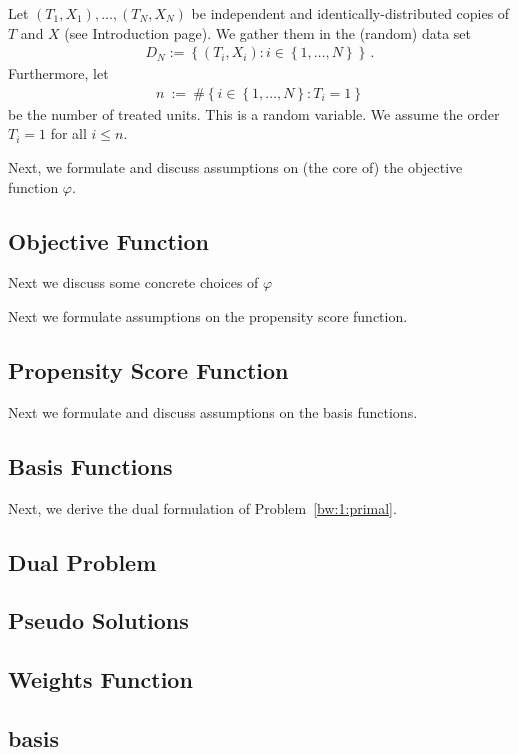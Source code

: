 Let $(T_1,X_1),\ldots,(T_N,X_N)$ be independent and identically-distributed copies of $T$ and $X$ (see Introduction page). 
We gather them in the (random) data set 
\begin{gather*}
D_N:=\left\{ (T_i,X_i)\colon i\in \left\{ 1,\ldots,N \right\} \right\}
\,.
\end{gather*}
Furthermore, let
\begin{gather*}
  n
  \ 
  :=
  \ 
  \# 
  \left\{ 
    i\in \left\{ 1,\ldots,N \right\}
    \colon
    T_i=1
  \right\}
\end{gather*}
be the number of treated units. This is a random variable. We assume the order $T_i=1$ for all $i\le n$.



Next, we formulate and discuss assumptions on (the core of) the objective function $\varphi$.
\subsection{Objective Function}


Next we discuss some concrete choices of $\varphi$



Next we formulate assumptions on the propensity score function.
\subsection{Propensity Score Function}



Next we formulate and discuss assumptions on the basis functions.
\subsection{Basis Functions}


Next, we derive the dual formulation of Problem~\ref{bw:1:primal}.
\subsection{Dual Problem}




\subsection{Pseudo Solutions}

\subsection{Weights Function}

\subsection{basis}


